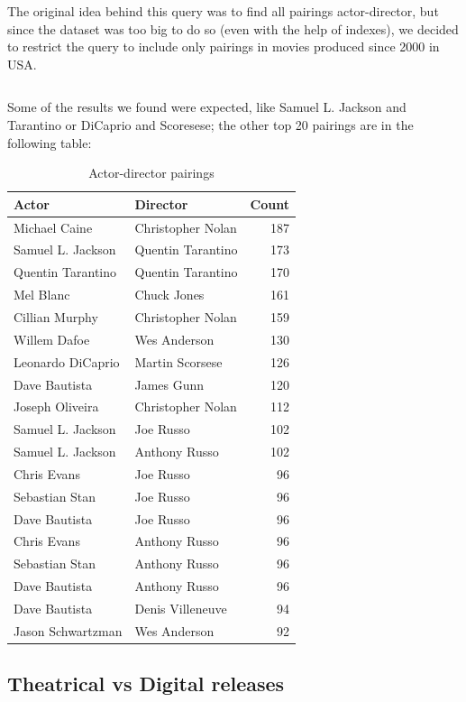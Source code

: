 \documentclass{Configuration_Files/PoliMi3i_thesis}
\begin{document}
The original idea behind this query was to find all pairings actor-director, but since the dataset was too big to do so (even with the help of indexes), we decided to restrict the query to include only pairings in movies produced since 2000 in USA.

\inputminted[frame=single,framesep=10pt,breaklines]{cypher}{letterboxd/queries/query9.cypher}

Some of the results we found were expected, like Samuel L. Jackson and Tarantino or DiCaprio and Scoresese; the other top 20 pairings are in the following table:

\begin{table}[h!]
\centering
\begin{tabular}{|l|l|r|}
\hline
\textbf{Actor} & \textbf{Director} & \textbf{Count} \\
\hline
Michael Caine & Christopher Nolan & 187 \\
Samuel L. Jackson & Quentin Tarantino & 173 \\
Quentin Tarantino & Quentin Tarantino & 170 \\
Mel Blanc & Chuck Jones & 161 \\
Cillian Murphy & Christopher Nolan & 159 \\
Willem Dafoe & Wes Anderson & 130 \\
Leonardo DiCaprio & Martin Scorsese & 126 \\
Dave Bautista & James Gunn & 120 \\
Joseph Oliveira & Christopher Nolan & 112 \\
Samuel L. Jackson & Joe Russo & 102 \\
Samuel L. Jackson & Anthony Russo & 102 \\
Chris Evans & Joe Russo & 96 \\
Sebastian Stan & Joe Russo & 96 \\
Dave Bautista & Joe Russo & 96 \\
Chris Evans & Anthony Russo & 96 \\
Sebastian Stan & Anthony Russo & 96 \\
Dave Bautista & Anthony Russo & 96 \\
Dave Bautista & Denis Villeneuve & 94 \\
Jason Schwartzman & Wes Anderson & 92 \\
\hline
\end{tabular}
\caption{Actor-director pairings}
\end{table}

 \subsection{Theatrical vs Digital releases}
\end{document}
